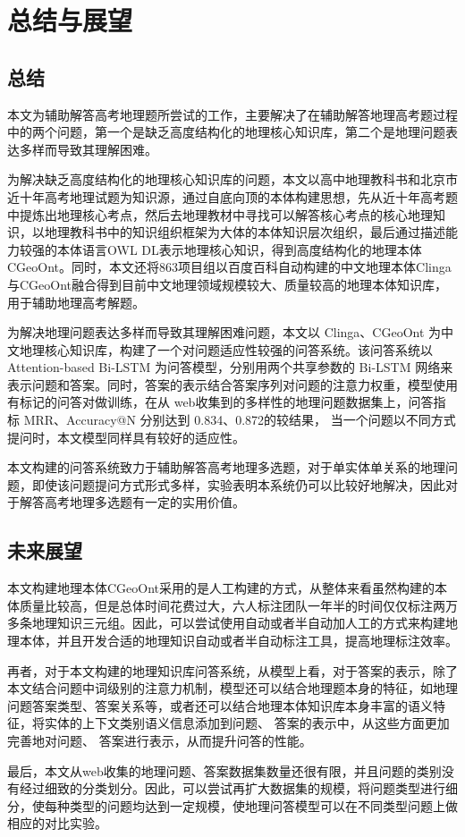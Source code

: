 \chapter{总结与展望}
\section{总结}
本文为辅助解答高考地理题所尝试的工作，主要解决了在辅助解答地理高考题过程中的两个问题，第一个是缺乏高度结构化的地理核心知识库，第二个是地理问题表达多样而导致其理解困难。

为解决缺乏高度结构化的地理核心知识库的问题，本文以高中地理教科书和北京市近十年高考地理试题为知识源，通过自底向顶的本体构建思想，先从近十年高考题中提炼出地理核心考点，然后去地理教材中寻找可以解答核心考点的核心地理知识，以地理教科书中的知识组织框架为大体的本体知识层次组织，最后通过描述能力较强的本体语言OWL DL表示地理核心知识，得到高度结构化的地理本体CGeoOnt。同时，本文还将863项目组以百度百科自动构建的中文地理本体Clinga与CGeoOnt融合得到目前中文地理领域规模较大、质量较高的地理本体知识库，用于辅助地理高考解题。

为解决地理问题表达多样而导致其理解困难问题，本文以 Clinga、CGeoOnt 为中文地理核心知识库，构建了一个对问题适应性较强的问答系统。该问答系统以 Attention-based Bi-LSTM 为问答模型，分别用两个共享参数的 Bi-LSTM 网络来表示问题和答案。同时，答案的表示结合答案序列对问题的注意力权重，模型使用有标记的问答对做训练，在从 web收集到的多样性的地理问题数据集上，问答指标 MRR、Accuracy@N 分别达到 0.834、0.872的较结果， 当一个问题以不同方式提问时，本文模型同样具有较好的适应性。

本文构建的问答系统致力于辅助解答高考地理多选题，对于单实体单关系的地理问题，即使该问题提问方式形式多样，实验表明本系统仍可以比较好地解决，因此对于解答高考地理多选题有一定的实用价值。

\section{未来展望}
本文构建地理本体CGeoOnt采用的是人工构建的方式，从整体来看虽然构建的本体质量比较高，但是总体时间花费过大，六人标注团队一年半的时间仅仅标注两万多条地理知识三元组。因此，可以尝试使用自动或者半自动加人工的方式来构建地理本体，并且开发合适的地理知识自动或者半自动标注工具，提高地理标注效率。

再者，对于本文构建的地理知识库问答系统，从模型上看，对于答案的表示，除了本文结合问题中词级别的注意力机制，模型还可以结合地理题本身的特征，如地理问题答案类型、答案关系等，或者还可以结合地理本体知识库本身丰富的语义特征，将实体的上下文类别语义信息添加到问题、 答案的表示中，从这些方面更加完善地对问题、 答案进行表示，从而提升问答的性能。

最后，本文从web收集的地理问题、答案数据集数量还很有限，并且问题的类别没有经过细致的分类划分。因此，可以尝试再扩大数据集的规模，将问题类型进行细分，使每种类型的问题均达到一定规模，使地理问答模型可以在不同类型问题上做相应的对比实验。
